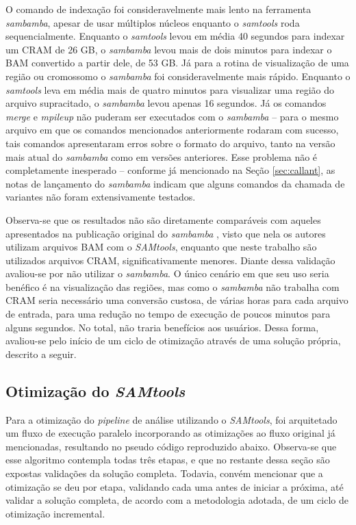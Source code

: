 \documentclass[cic,tc]{iiufrgs}
\begin{document}
O comando de indexação foi consideravelmente mais lento na ferramenta \textit{sambamba},
apesar de usar múltiplos núcleos enquanto o \textit{samtools} roda sequencialmente.
Enquanto o \textit{samtools} levou em média 40 segundos para indexar um CRAM de 26 GB, o
\textit{sambamba} levou mais de dois minutos para indexar o BAM convertido a partir
dele, de 53 GB. Já para a rotina de visualização de uma região ou cromossomo o
\textit{sambamba} foi consideravelmente mais rápido. Enquanto o \textit{samtools} leva em média
mais de quatro minutos para visualizar uma região do arquivo supracitado, o
\textit{sambamba} levou apenas 16 segundos. Já os comandos \textit{merge} e
\textit{mpileup} não puderam ser executados com o \textit{sambamba} -- para o mesmo
arquivo em que os comandos mencionados anteriormente rodaram com sucesso, tais
comandos apresentaram erros sobre o formato do arquivo, tanto na versão mais
atual do \textit{sambamba} como em versões anteriores. Esse problema não é completamente
inesperado -- conforme já mencionado na Seção \ref{sec:callant}, as notas de
lançamento do \textit{sambamba} indicam que alguns comandos da chamada de variantes não
foram extensivamente testados. 

Observa-se que os resultados não são diretamente comparáveis com aqueles
apresentados na publicação original do \textit{sambamba} \cite{tarasov2015sambamba},
visto que nela os autores utilizam arquivos BAM com o \textit{SAMtools}, enquanto que
neste trabalho são utilizados arquivos CRAM, significativamente menores. Diante
dessa validação avaliou-se por não utilizar o \textit{sambamba}. O único cenário em que
seu uso seria benéfico é na visualização das regiões, mas como o \textit{sambamba} não
trabalha com CRAM seria necessário uma conversão custosa, de várias horas para
cada arquivo de entrada, para uma redução no tempo de execução de poucos
minutos para alguns segundos.  No total, não traria benefícios aos usuários.
Dessa forma, avaliou-se pelo início de um ciclo de otimização através de uma
solução própria, descrito a seguir.

\subsection{Otimização do \textit{SAMtools}}
\label{sec:parsamtools}

Para a otimização do \textit{pipeline} de análise utilizando o
\textit{SAMtools}, foi arquitetado um fluxo de execução paralelo incorporando
as otimizações ao fluxo original já mencionadas, resultando no pseudo código
reproduzido abaixo. Observa-se que esse algoritmo contempla todas três etapas,
e que no restante dessa seção são expostas validações da solução completa.
Todavia, convém mencionar que a otimização se deu por etapa, validando cada uma
antes de iniciar a próxima, até validar a solução completa, de acordo com a
metodologia adotada, de um ciclo de otimização incremental.
\end{document}
